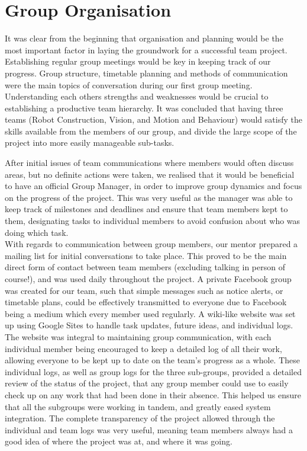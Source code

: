 \section{Group Organisation}

It was clear from the beginning that organisation and planning would be the most important factor in laying the groundwork for a successful team project. Establishing regular group meetings would be key in keeping track of our progress. Group structure, timetable planning and methods of communication were the main topics of conversation during our first group meeting. Understanding each others strengths and weaknesses would be crucial to establishing a productive team hierarchy. It was concluded that having three teams (Robot Construction, Vision, and Motion and Behaviour) would satisfy the skills available from the members of our group, and divide the large scope of the project into more easily manageable sub-tasks. \linebreak

After initial issues of team communications where members would often discuss areas, but no definite actions were taken, we realised that it would be beneficial to have an official Group Manager, in order to improve group dynamics and focus on the progress of the project. This was very useful as the manager was able to keep track of milestones and deadlines and ensure that team members kept to them, designating tasks to individual members to avoid confusion about who was doing which task.\\

With regards to communication between group members, our mentor prepared a mailing list for initial conversations to take place. This proved to be the main direct form of contact between team members (excluding talking in person of course!), and was used daily throughout the project. A private Facebook group was created for our team, such that simple messages such as notice alerts, or timetable plans, could be effectively transmitted to everyone due to Facebook being a medium which every member used regularly. A wiki-like website was set up using Google Sites to handle task updates, future ideas, and individual logs. The website was integral to maintaining group communication, with each individual member being encouraged to keep a detailed log of all their work, allowing everyone to be kept up to date on the team’s progress as a whole. These individual logs, as well as group logs for the three sub-groups, provided a detailed review of the status of the project, that any group member could use to easily check up on any work that had been done in their absence. This helped us ensure that all the subgroups were working in tandem, and greatly eased system integration. The complete transparency of the project allowed through the individual and team logs was very useful, meaning team members always had a good idea of where the project was at, and where it was going. \linebreak

